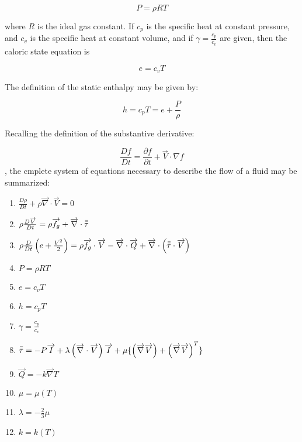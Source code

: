 \begin{equation}
  P = \rho R T
\end{equation}

where $R$ is the ideal gas constant. If $c_p$ is the specific heat at constant pressure, and $c_v$ is the specific heat at constant volume, and if $\gamma = \frac{c_p}{c_v}$ are given, then the caloric state equation is

\begin{equation}
  e = c_v T
\end{equation}

The definition of the static enthalpy may be given by:

\begin{equation}
  h = c_p T = e + \frac{P}{\rho}
\end{equation}

Recalling the definition of the substantive derivative:

\begin{equation}
  \frac{Df}{Dt} = \frac{\partial f}{\partial t} + \overrightarrow{V}\cdot\nabla f
\end{equation}, the cmplete system of equations necessary to describe the flow of a fluid may be summarized:

\begin{enumerate}
  \item{$
    \frac{D\rho}{Dt} 
    + \rho \overrightarrow{\nabla}\cdot\overrightarrow{V} = 0
  $}
  \item{$
    \rho\frac{D\overrightarrow{V}}{Dt} = 
    \rho\overrightarrow{f_g} 
    + \overrightarrow{\nabla}\cdot\bar{\bar{\tau}} 
  $}
  \item{$
    \rho\frac{D}{Dt}\left(e + \frac{V^2}{2}\right) =
    \rho \overrightarrow{f_g}\cdot\overrightarrow{V}
    - \overrightarrow{\nabla}\cdot\overrightarrow{Q}
    + \overrightarrow{\nabla}\cdot\left(\bar{\bar{\tau}}\cdot\overrightarrow{V}\right)
  $}
  \item{$P = \rho R T $}
  \item{$e = c_v T $}
  \item{$h = c_p T $}
  \item{$ \gamma = \frac{c_p}{c_v} $}
  \item{$
    \bar{\bar{\tau}} = 
    - P\overrightarrow{I} 
    + \lambda\left(\overrightarrow{\nabla}\cdot\overrightarrow{V}\right)\overrightarrow{I}
    + \mu\{\left(\overrightarrow{\nabla}\overrightarrow{V}\right) 
    + \left(\overrightarrow{\nabla}\overrightarrow{V}\right)^T\}
  $}
  \item{$ \overrightarrow{Q} = -k \overrightarrow{\nabla}T $}
  \item{$ \mu = \mu(T) $}
  \item{$\lambda = -\frac{2}{3}\mu $}
  \item{$k = k(T) $}
\end{enumerate}

